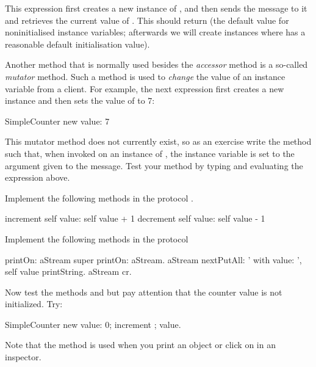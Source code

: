 


This expression first creates a new instance of
, and then sends the message  to it
and retrieves the current value of . This should return
 (the default value for noninitialised instance variables;
afterwards we will create instances where  has a
reasonable default initialisation value).


\exercise  Another method that is normally used besides the
\textit{accessor} method is a so-called \textit{mutator} method.
Such a method is used to \emph{change} the value of an instance variable
from a client. For example, the next expression first creates a
new  instance and then sets the value of
 to 7:
\begin{code}
SimpleCounter new value: 7
\end{code}


This mutator method does not currently exist, so as an exercise
write the method  such that, when invoked on
an instance of , the 
instance variable is set to the argument given to the message.
Test your method by typing and evaluating the expression above.

\exercise Implement the following methods in the protocol
.

\begin{code}
increment
    self value: self value + 1
decrement
    self value: self value - 1
\end{code}

\exercise Implement the following methods in the protocol
\begin{code}
printOn: aStream
    super printOn: aStream.
    aStream nextPutAll: ' with value: ',
    self  value printString.
    aStream cr.
\end{code}

Now test the methods  and  but pay
attention that the counter value is not initialized. Try:
\begin{code}
SimpleCounter new value: 0; increment ; value.
\end{code}
Note that the method  is used when you print an
object or click on  in an inspector.

